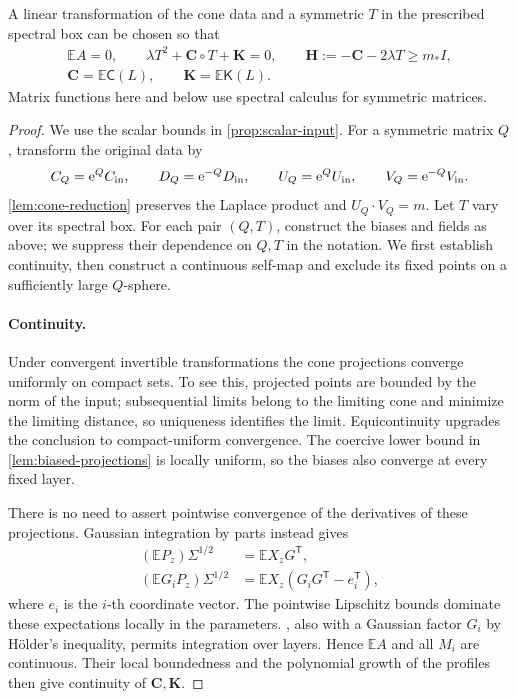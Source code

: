 \begin{proposition}\label{prop:normalization}
A linear transformation of the cone data and a symmetric $T$ in the prescribed spectral box can be chosen so that
\begin{equation}
\begin{gathered}
\mathbb{E}A=0,\qquad \lambda T^2+\mathbf{C}\circ T+\mathbf{K}=0,\qquad
\mathbf{H}:=-\mathbf{C}-2\lambda T\ge m_*I,\\
\mathbf{C}=\mathbb{E}\mathsf C(L),\qquad \mathbf{K}=\mathbb{E}\mathsf K(L).
\end{gathered}\label{eq:covariance-fixed-point}
\end{equation}
Matrix functions here and below use spectral calculus for symmetric matrices.
\end{proposition}
\begin{proof}
We use the scalar bounds in \cref{prop:scalar-input}. For a symmetric matrix $Q$, transform the original data by
\[
 C_Q=\mathrm{e}^QC_{\rm in},\qquad D_Q=\mathrm{e}^{-Q}D_{\rm in},\qquad
 U_Q=\mathrm{e}^QU_{\rm in},\qquad V_Q=\mathrm{e}^{-Q}V_{\rm in}.
\]
\cref{lem:cone-reduction} preserves the Laplace product and $U_Q\cdot V_Q=m$. Let $T$ vary over its spectral box. For each pair $(Q,T)$, construct the biases and fields as above; we suppress their dependence on $Q,T$ in the notation. We first establish continuity, then construct a continuous self-map and exclude its fixed points on a sufficiently large $Q$-sphere.

\paragraph{Continuity.}
Under convergent invertible transformations the cone projections converge uniformly on compact sets. To see this, projected points are bounded by the norm of the input; subsequential limits belong to the limiting cone and minimize the limiting distance, so uniqueness identifies the limit. Equicontinuity upgrades the conclusion to compact-uniform convergence. The coercive lower bound in \cref{lem:biased-projections} is locally uniform, so the biases also converge at every fixed layer.

There is no need to assert pointwise convergence of the derivatives of these projections. Gaussian integration by parts instead gives
\[
\begin{aligned}
(\mathbb{E}P_z)\Sigma^{1/2}&=\mathbb{E} X_zG^{\mathsf T},\\
(\mathbb{E} G_iP_z)\Sigma^{1/2}
&=\mathbb{E} X_z(G_iG^{\mathsf T}-e_i^{\mathsf T}),
\end{aligned}
\]
where $e_i$ is the $i$-th coordinate vector. The pointwise Lipschitz bounds dominate these expectations locally in the parameters. , also with a Gaussian factor $G_i$ by H\"older's inequality, permits integration over layers. Hence $\mathbb{E}A$ and all $M_i$ are continuous. Their local boundedness and the polynomial growth of the profiles then give continuity of $\mathbf{C},\mathbf{K}$.


\end{proof}

